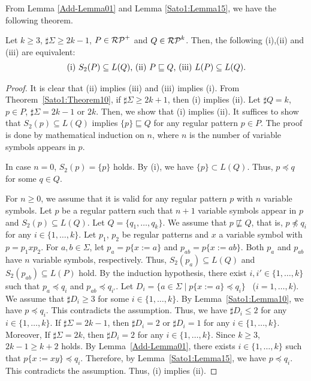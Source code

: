 From Lemma \ref{Add-Lemma01} 
and Lemma \ref{Sato1:Lemma15}, 
we have the following theorem.


\begin{thm}\label{Theorem17}
    Let $k \geq 3$, $\sharp\Sigma \geq 2k-1$, $P \in \mathcal{RP}^{+}$ and
    $Q \in \mathcal{RP}^{k}$.
    Then, the following (i),(ii) and (iii) are equivalent:
    \[
        \begin{tabular}{ll}
            $(\mathrm{i})$ $S_{2}(P) \subseteq L(Q)$,
            $(\mathrm{ii})$ $P \sqsubseteq Q$,
            $(\mathrm{iii})$ $L(P) \subseteq L(Q)$.
        \end{tabular}
    \]
\end{thm}


\begin{proof}
    It is clear that (ii) implies (iii) and (iii) implies (i).
    From Theorem~\ref{Sato1:Theorem10}, 
    if $\sharp\Sigma \geq 2k+1$, then
    (i) implies (ii).
    Let $\sharp Q = k$, $p \in P$, $\sharp\Sigma = 2k-1$ or $2k$.
    Then, we show that (i) implies (ii).
    It suffices to show that $S_{2}(p) \subseteq L(Q)$ implies {\color{red}$\{p\} \sqsubseteq Q$}
    for any regular pattern {\color{red}$p \in P$}.
    The proof is done by mathematical induction on $n$, where $n$ is the number of variable symbols appears in $p$.

    In case $n=0$, $S_{2}(p) = \{p\}$ holds.
    By (i), we have {\color{red}$\{p\} \subset L(Q)$}. Thus, $p \preceq q$ for some $q \in Q$.

    For $n \geq 0$,
    we assume that it is valid for any regular pattern $p$
    with $n$ variable symbols.
    Let $p$ be a regular pattern such that $n+1$ variable symbols appear in $p$
    and $S_{2}(p) \subseteq L(Q)$.
    {\color{red} Let $Q = \{q_{1},\ldots,q_{k}\}$.}
    We assume that $p \not\sqsubseteq Q$, that is, {\color{red}$p \not\preceq q_{i}$}
    for any $i \in \{1,\ldots,k\}$.
    {\color{red} Let $p_{1}$, $p_{2}$ be regular patterns and $x$ a variable symbol with $p = p_{1}xp_{2}$.}
    For $a, b \in \Sigma$,
    let $p_{a}=p\{x:=a\}$ and $p_{ab}=p\{x:=ab\}$.
    Both $p_{a}$ and $p_{ab}$ have $n$ variable symbols, respectively.
    Thus, $S_{2}(p_{a}) \subseteq L(Q)$ and $S_{2}(p_{ab}) \subseteq L(P)$ hold.
    By the induction hypothesis,
    there exist $i, i' \in \{1,\ldots,k\}$ such that
    $p_{a} \preceq q_{i}$ and $p_{ab} \preceq q_{i'}$.
    Let $D_{i} = \{a \in \Sigma \mid p\{x:=a\} \preceq q_{i}\}$ \ ($i=1,\ldots,k$).
    We assume that $\sharp D_{i} \geq 3$ for some $i \in \{1,\ldots, k\}$.
    By Lemma~\ref{Sato1:Lemma10}, 
    we have $p \preceq q_{i}$.
    This contradicts the assumption.
    Thus, we have $\sharp D_{i} \leq 2$ for any $i \in \{1,\ldots,k\}$.
    If $\sharp\Sigma = 2k-1$, then
    $\sharp D_{i}=2$ or $\sharp D_{i}=1$ for any $i \in \{1,\ldots,k\}$.
    Moreover,
    If $\sharp\Sigma = 2k$, then
    $\sharp D_{i}=2$ for any $i \in \{1,\ldots,k\}$.
    Since $k \geq 3$, {\color{red} $2k-1 \geq k+2$} holds.
    By Lemma~\ref{Add-Lemma01},
    there exists $i \in \{1,\ldots,k\}$ such that $p\{x:=xy\} \preceq q_{i}$.
    Therefore, by Lemma~\ref{Sato1:Lemma15}, 
    we have $p \preceq q_{i}$.
    This contradicts the assumption.
    Thus, (i) implies (ii).
\end{proof}

